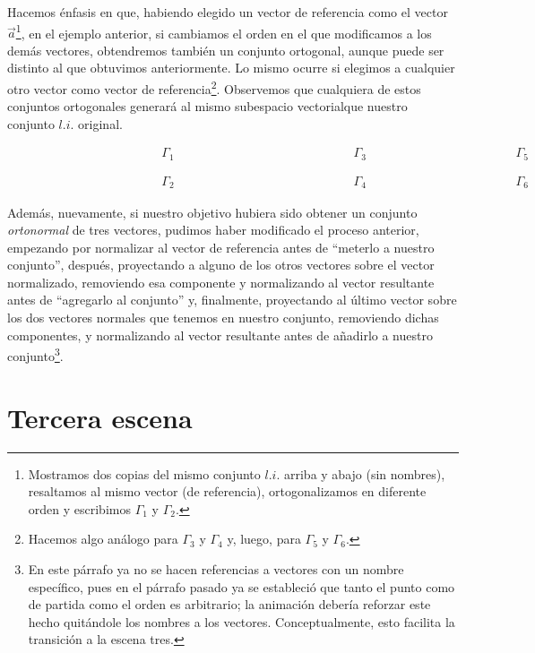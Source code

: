 \documentclass[12pt,dvipsnames]{article}
\numberwithin{equation}{section}
\begin{document}
Hacemos énfasis en que, habiendo elegido un vector de referencia \textemdash como el vector $\vec{a}$\footnote{Mostramos dos copias del mismo conjunto $l.i.$ arriba y abajo (sin nombres), resaltamos al mismo vector (de referencia), ortogonalizamos en diferente orden y escribimos $\Gamma_1$ y $\Gamma_2$.}, en el ejemplo anterior\textemdash, si cambiamos el orden en el que modificamos a los demás vectores, obtendremos también un conjunto ortogonal, aunque puede ser distinto al que obtuvimos anteriormente. Lo mismo ocurre si elegimos a cualquier otro vector como vector de referencia\footnote{Hacemos algo análogo para $\Gamma_3$ y $\Gamma_4$ y, luego, para $\Gamma_5$ y $\Gamma_6$.}. Observemos que cualquiera de estos conjuntos ortogonales generará al mismo subespacio vectorialque nuestro conjunto $l.i.$ original.

\begin{align*}
    \hspace{5cm}\Gamma_1 \hspace{6cm}\Gamma_3 \hspace{5cm}\Gamma_5 \\
    \\
    \\
    \hspace{5cm}\Gamma_2 \hspace{6cm}\Gamma_4 \hspace{5cm}\Gamma_6
\end{align*}

Además, nuevamente, si nuestro objetivo hubiera sido obtener un conjunto \emph{ortonormal} de tres vectores, pudimos haber modificado el proceso anterior, empezando por normalizar al vector de referencia antes de ``meterlo a nuestro conjunto'', después, proyectando a alguno de los otros vectores sobre el vector normalizado, removiendo esa componente y normalizando al vector resultante antes de ``agregarlo al conjunto'' y, finalmente, proyectando al último vector sobre los dos vectores normales que tenemos en nuestro conjunto, removiendo dichas componentes, y normalizando al vector resultante antes de añadirlo a nuestro conjunto\footnote{En este párrafo ya no se hacen referencias a vectores con un nombre específico, pues en el párrafo pasado ya se estableció que tanto el punto como de partida como el orden es arbitrario; la animación debería reforzar este hecho quitándole los nombres a los vectores. Conceptualmente, esto facilita la transición a la escena tres.}.

\newpage
\section{Tercera escena}
\end{document}
